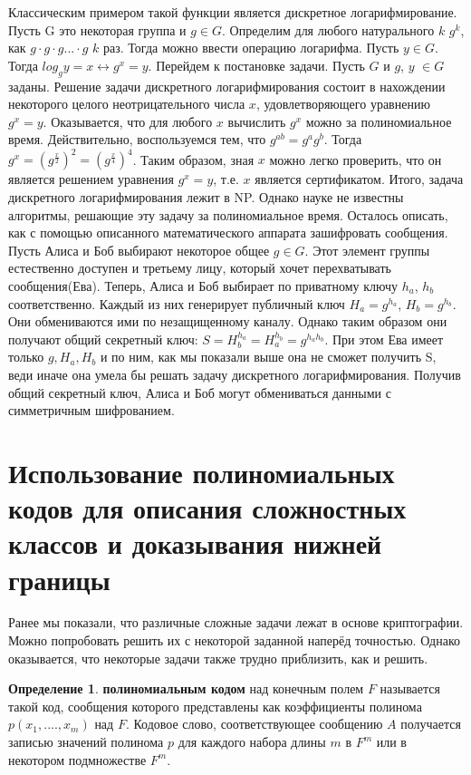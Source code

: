 \documentclass{article}
\theoremstyle{definition}
\newtheorem{definition}{Определение}[section]
\begin{document}
Классическим примером такой функции является дискретное логарифмирование. Пусть G это некоторая группа и $g \in G$. Определим для любого натурального $k$ $g^k$, как $g \cdot g \cdot g ... \cdot g$ $k$ раз. Тогда можно ввести операцию логарифма. Пусть $y \in G$. Тогда $log_g{y} = x \leftrightarrow g^x = y$.\newline
Перейдем к постановке задачи. Пусть $G$ и $g$, $y$  $\in G $ заданы. Решение задачи дискретного логарифмирования состоит в нахождении некоторого целого неотрицательного числа $x$, удовлетворяющего уравнению $g^x = y$.
Оказывается, что для любого $x$ вычислить $g^{x}$ можно за полиномиальное время. Действительно, воспользуемся тем, что $g^{ab} = g^{a}g^{b}$. Тогда $g^{x} = (g^{\frac{x}{2}})^2 = (g^{\frac{x}{4}})^4$. Таким образом, зная $x$ можно легко проверить, что он является решением уравнения $g^x = y$, т.е. $x$ является сертификатом. Итого, задача дискретного логарифмирования лежит в NP. Однако науке не известны алгоритмы, решающие эту задачу за полиномиальное время. \newline
Осталось описать, как с помощью описанного математического аппарата зашифровать сообщения. Пусть Алиса и Боб выбирают некоторое общее $g \in G$. Этот элемент группы естественно доступен и третьему лицу, который хочет перехватывать сообщения(Ева). Теперь, Алиса и Боб выбирает по
приватному ключу $h_a$, $h_b$ соответственно. Каждый из них генерирует публичный ключ $H_a = g^{h_a}$, $H_b = g^{h_b}$. Они обмениваются ими по незащищенному каналу.
Однако таким образом они получают общий секретный ключ: $S = H^{h_a}_b = H^{h_b}_a = g^{h_ah_b}$. При этом Ева имеет только $g, H_a, H_b$ и по ним, как мы показали выше она не сможет получить S, веди иначе она умела бы решать задачу дискретного логарифмирования. Получив общий секретный ключ, Алиса и Боб могут обмениваться данными с симметричным шифрованием.

\section{Использование полиномиальных кодов для описания сложностных классов и доказывания нижней границы}

Ранее мы показали, что различные сложные задачи лежат в основе криптографии. Можно попробовать решить их с некоторой заданной наперёд точностью. Однако оказывается, что некоторые задачи также трудно приблизить, как и решить.

\theoremstyle{definition}
\begin{definition}{}
\textbf{полиномиальным кодом} над конечным полем $F$ называется такой код, сообщения которого представлены как коэффициенты полинома $p(x_1, ...., x_m)$ над $F$. Кодовое слово, соответствующее сообщению $A$ получается записью значений полинома $p$ для каждого набора длины $m$ в $F^m$ или в некотором подмножестве $F^m$.
\end{definition}
\end{document}
